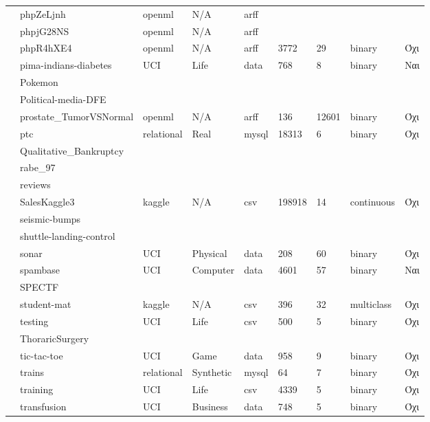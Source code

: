 \begin{longtable}{| p{} | p{}| p{} | p{} | p{} | p{} | p{} | p{} | p{} | }
 			\rownumber & phpZeLjnh & openml & N/A & arff & & & & \\
 			\rownumber & phpjG28NS & openml & N/A & arff & & & & \\
 			\rownumber & phpR4hXE4 & openml & N/A & arff & 3772 & 29 & binary & Όχι \\
 			\rownumber & pima-indians-diabetes \citep{pima} & UCI & Life & data & 768 & 8 & binary & Ναι \\
 			\rownumber & Pokemon & & & & & & & \\
 			\rownumber & Political-media-DFE & & & & & & & \\
 			\rownumber & prostate\_TumorVSNormal & openml & N/A & arff & 136 & 12601  & binary & Όχι \\
 			\rownumber & ptc \citep{Helma2001,} & relational & Real  & mysql & 18313 & 6 & binary & Όχι \\
 			\rownumber & Qualitative\_Bankruptcy & & & & & & & \\
 			\rownumber & rabe\_97 & & & & & & & \\
 			\rownumber & reviews & & & & & & & \\
 			\rownumber & SalesKaggle3 \citep{sales} & kaggle & N/A & csv & 198918 & 14 & continuous & Όχι \\
 			\rownumber & seismic-bumps & & & & & & & \\
 			\rownumber & shuttle-landing-control & & & & & & & \\
 			\rownumber & sonar & UCI & Physical & data & 208 & 60 & binary  & Όχι \\
 			\rownumber & spambase \citep{spam} & UCI & Computer & data & 4601 & 57 & binary & Ναι  \\
 			\rownumber & SPECTF & & & & & & & \\
 			\rownumber & student-mat \citep{alcohol} & kaggle & N/A & csv & 396 & 32 & multiclass & Όχι \\
 			\rownumber & testing \citep{wilt} & UCI & Life & csv & 500 & 5 & binary & Όχι \\
 			\rownumber & ThoraricSurgery & & & & & & & \\
 			\rownumber & tic-tac-toe \citep{tic} & UCI & Game & data & 958 & 9 &  binary & Όχι \\
 			\rownumber & trains \citep{Trains} & relational & Synthetic & mysql & 64 & 7 & binary & Όχι \\
 			\rownumber & training \citep{wilt} & UCI & Life  & csv & 4339 & 5 & binary & Όχι \\
 			\rownumber & transfusion & UCI & Business & data & 748 & 5 & binary& Όχι \\

\end{longtable}
